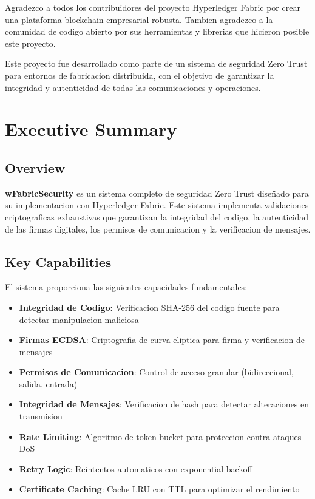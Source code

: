 \documentclass[12pt,a4paper]{report}
\begin{document}
Agradezco a todos los contribuidores del proyecto Hyperledger Fabric por crear una plataforma blockchain empresarial robusta. Tambien agradezco a la comunidad de codigo abierto por sus herramientas y librerias que hicieron posible este proyecto.

\bigskip

Este proyecto fue desarrollado como parte de un sistema de seguridad Zero Trust para entornos de fabricacion distribuida, con el objetivo de garantizar la integridad y autenticidad de todas las comunicaciones y operaciones.

\cleardoublepage

\chapter{Executive Summary}
\cleardoublepage

\section{Overview}

\textbf{wFabricSecurity} es un sistema completo de seguridad Zero Trust dise\"nado para su implementacion con Hyperledger Fabric. Este sistema implementa validaciones criptograficas exhaustivas que garantizan la integridad del codigo, la autenticidad de las firmas digitales, los permisos de comunicacion y la verificacion de mensajes.

\section{Key Capabilities}

El sistema proporciona las siguientes capacidades fundamentales:

\begin{itemize}
    \item \textbf{Integridad de Codigo}: Verificacion SHA-256 del codigo fuente para detectar manipulacion maliciosa
    \item \textbf{Firmas ECDSA}: Criptografia de curva eliptica para firma y verificacion de mensajes
    \item \textbf{Permisos de Comunicacion}: Control de acceso granular (bidireccional, salida, entrada)
    \item \textbf{Integridad de Mensajes}: Verificacion de hash para detectar alteraciones en transmision
    \item \textbf{Rate Limiting}: Algoritmo de token bucket para proteccion contra ataques DoS
    \item \textbf{Retry Logic}: Reintentos automaticos con exponential backoff
    \item \textbf{Certificate Caching}: Cache LRU con TTL para optimizar el rendimiento
\end{itemize}
\end{document}
